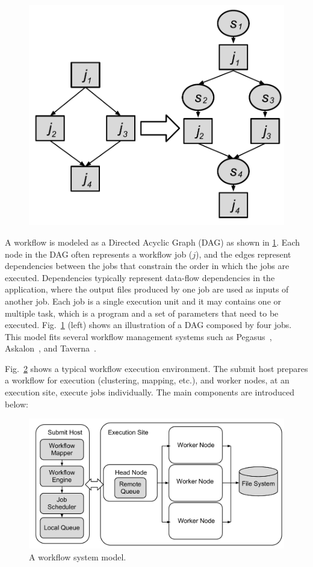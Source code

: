 \documentclass[final]{IEEEtran}
\begin{document}
\begin{figure}[htb]
	\centering
	\includegraphics[width=0.7\linewidth]{figure/odag.pdf}
	\label{fig:odag}
	\vspace{-10pt}
\end{figure}
A workflow is modeled as a Directed Acyclic Graph (DAG) as shown in \ref{fig:odag}. Each node in the DAG often represents a workflow job ($j$), and the edges represent dependencies between the jobs that constrain the order in which the jobs are executed. Dependencies typically represent data-flow dependencies in the application, where the output files produced by one job are used as inputs of another job. Each job is a single execution unit and it may contains one or multiple task, which is a program and a set of parameters that need to be executed. Fig.~\ref{fig:odag} (left) shows an illustration of a DAG composed by four jobs. This model fits several workflow management systems such as Pegasus~\cite{Deelman:2005:PFM:1239649.1239653}, Askalon~\cite{Fahringer:2005:ATS:1064323.1064331}, and Taverna~\cite{Oinn:2006:TLC:1148437.1148448}.


Fig.~\ref{fig:system} shows a typical workflow execution environment. The submit host prepares a workflow for execution (clustering, mapping, etc.), and worker nodes, at an execution site, execute jobs individually. The main components are introduced below:

\begin{figure}[htb]
\centering
  \includegraphics[width=0.95\linewidth]{figure/execution.pdf}
  \caption{A workflow system model.}
  \label{fig:system}
  \vspace{-10pt}
\end{figure}
\end{document}
